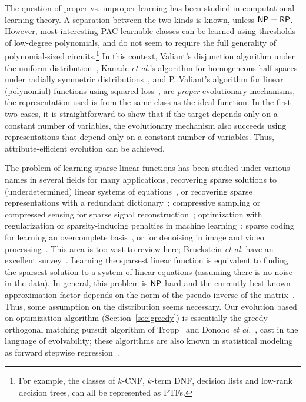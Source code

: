 The question of proper vs. improper learning has been studied in computational
learning theory. A separation between the two kinds is known, unless $\mathsf{NP} =
\mathsf{RP}$. However, most interesting PAC-learnable classes can be learned using
thresholds of low-degree polynomials, and do not seem to require the full
generality of polynomial-sized circuits.\footnote{For example, the classes of
$k$-CNF, $k$-term DNF, decision lists and low-rank decision trees, can all be
represented as PTFs.} In this context, Valiant's disjunction algorithm under the
uniform distribution~\cite{Valiant:2009-evolvability}, Kanade {\it et al.}'s
algorithm for homogeneous half-spaces under radially symmetric
distributions~\cite{KVV:2010-drift}, and P. Valiant's algorithm for linear
(polynomial) functions using squared loss~\cite{Valiant:2012-real}, are
\emph{proper} evolutionary mechanisms, \ie the representation used is from the
same class as the ideal function.  In the first two cases, it is straightforward
to show that if the target depends only on a constant number of variables, the
evolutionary mechanism also succeeds using representations that depend only on a
constant number of variables. Thus, attribute-efficient evolution can be
achieved.

The problem of learning sparse linear functions has been studied under various
names in several fields for many applications, \eg recovering sparse solutions
to (underdetermined) linear systems of equations~\cite{Donoho:2009-sparse}, or
recovering sparse representations with a redundant
dictionary~\cite{Mallat:2008,Elad:2010}; compressive sampling or compressed
sensing for sparse signal reconstruction~\cite{Candes:2008}; optimization with
regularization or sparsity-inducing penalties in machine
learning~\cite{Bach:2012}; sparse coding for learning an overcomplete
basis~\cite{Olshausen:1997}, or for denoising in image and video
processing~\cite{Elad:2010}. This area is too vast to review here; Bruckstein
\emph{et al.} have an excellent survey~\cite{Donoho:2009-sparse}.  Learning the
sparsest linear function is equivalent to finding the sparsest solution to a
system of linear equations (assuming there is no noise in the data). In general,
this problem is $\mathsf{NP}$-hard and the currently best-known approximation factor
depends on the norm of the pseudo-inverse of the matrix~\cite{Natarajan:1995}.
Thus, some assumption on the distribution seems necessary. Our evolution based
on optimization algorithm (Section~\ref{sec:greedy}) is essentially the greedy
orthogonal matching pursuit algorithm of Tropp~\cite{Tropp:2004-greed} and
Donoho \emph{et al.}~\cite{Donoho:2006-recovery}, cast in the language of
evolvability; these algorithms are also known in statistical modeling as forward
stepwise regression~\cite{Daniel:1999,Hastie:2001}.

